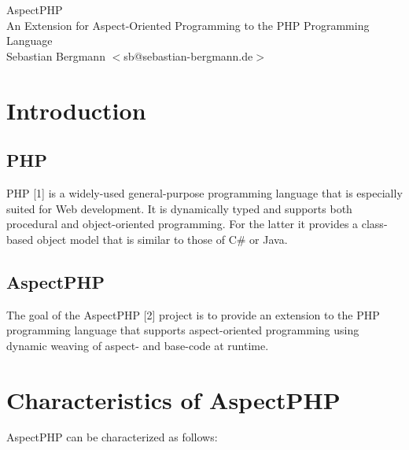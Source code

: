 \documentclass[landscape,a0]{a0poster}
\begin{document}
\lstset{language=PHP,showstringspaces=false}

\renewcommand{\columnfrac}{.45}
\begin{header}
\begin{center}

\VeryHuge
AspectPHP\\
\huge
An Extension for Aspect-Oriented Programming to the PHP Programming Language\\
\LARGE
Sebastian Bergmann $<$sb@sebastian-bergmann.de$>$
\end{center}
\end{header}

\begin{poster}

\begin{pcolumn}

\begin{pbox}
\large
  \section{Introduction}

    \subsection{PHP}

      PHP [1] is a widely-used general-purpose programming language that is
      especially suited for Web development. It is dynamically typed and
      supports both procedural and object-oriented programming.
      For the latter it provides a class-based object model that is similar to
      those of C\# or Java.

    \subsection{AspectPHP}

      The goal of the AspectPHP [2] project is to provide an extension to
      the PHP programming language that supports aspect-oriented programming
      using dynamic weaving of aspect- and base-code at runtime.

  \section{Characteristics of AspectPHP}

    AspectPHP can be characterized as follows:

    \begin{enumerate}


\end{enumerate}
\end{pbox}
\end{pcolumn}
\end{poster}
\end{document}
